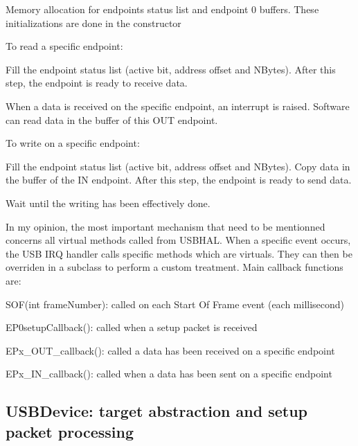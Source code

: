 \documentclass[pdftex,10pt,a4paper]{report}
\newenvironment{packed_item}{
\begin{itemize}
  \setlength{\itemsep}{1pt}
  \setlength{\parskip}{0pt}
  \setlength{\parsep}{0pt}
}{\end{itemize}}
\begin{document}
\begin{packed_item}
	\item Memory allocation for endpoints status list and endpoint 0 buffers. These initializations are done in the constructor
	\item To read a specific endpoint:
		\begin{packed_item}
			\item Fill the endpoint status list (active bit, address offset and NBytes). After this step, the endpoint is ready to receive data.
			\item When a data is received on the specific endpoint, an interrupt is raised. Software can read data in the buffer of this OUT endpoint.
		\end{packed_item}
	\item To write on a specific endpoint:
		\begin{packed_item}
			\item Fill the endpoint status list (active bit, address offset and NBytes). Copy data in the buffer of the IN endpoint. After this step, the endpoint is ready to send data.
			\item Wait until the writing has been effectively done.
		\end{packed_item}
\end{packed_item}


In my opinion, the most important mechanism that need to be mentionned concerns all virtual methods called from USBHAL. When a specific event occurs, the USB IRQ handler calls specific methods which are virtuals. They can then be overriden in a subclass to perform a custom treatment. Main callback functions are:
\begin{packed_item}
	\item SOF(int frameNumber): called on each Start Of Frame event (each millisecond)
	\item EP0setupCallback(): called when a setup packet is received
	\item EPx\_OUT\_callback(): called a data has been received on a specific endpoint
	\item EPx\_IN\_callback(): called when a data has been sent on a specific endpoint
\end{packed_item}


\subsection{USBDevice: target abstraction and setup packet processing}
\end{document}

